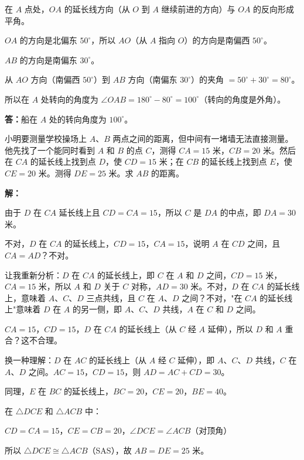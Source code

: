 \documentclass[12pt, a4paper]{ctexart}
\begin{document}
在 $A$ 点处，$OA$ 的延长线方向（从 $O$ 到 $A$ 继续前进的方向）与 $OA$ 的反向形成平角。

$OA$ 的方向是北偏东 $50^\circ$，所以 $AO$（从 $A$ 指向 $O$）的方向是南偏西 $50^\circ$。

$AB$ 的方向是南偏东 $30^\circ$。

从 $AO$ 方向（南偏西 $50^\circ$）到 $AB$ 方向（南偏东 $30^\circ$）的夹角 $=50^\circ+30^\circ=80^\circ$。

所以在 $A$ 处转向的角度为 $\angle OAB=180^\circ-80^\circ=100^\circ$（转向的角度是外角）。

\textbf{答：}船在 $A$ 处的转向角度为 $100^\circ$。

\vspace{6pt}

\begin{appbox}[【应用3】测量中的几何应用]
小明要测量学校操场上 $A$、$B$ 两点之间的距离，但中间有一堵墙无法直接测量。他先找了一个能同时看到 $A$ 和 $B$ 的点 $C$，测得 $CA=15$ 米，$CB=20$ 米。然后在 $CA$ 的延长线上找到点 $D$，使 $CD=15$ 米；在 $CB$ 的延长线上找到点 $E$，使 $CE=20$ 米。测得 $DE=25$ 米。求 $AB$ 的距离。
\end{appbox}

\textbf{解：}

由于 $D$ 在 $CA$ 延长线上且 $CD=CA=15$，所以 $C$ 是 $DA$ 的中点，即 $DA=30$ 米。

不对，$D$ 在 $CA$ 的延长线上，$CD=15$，$CA=15$，说明 $A$ 在 $CD$ 之间，且 $CA=AD$？不对。

让我重新分析：$D$ 在 $CA$ 的延长线上，即 $C$ 在 $A$ 和 $D$ 之间，$CD=15$ 米，$CA=15$ 米，所以 $A$ 和 $D$ 关于 $C$ 对称，$AD=30$ 米。不对，$D$ 在 $CA$ 的延长线上，意味着 $A$、$C$、$D$ 三点共线，且 $C$ 在 $A$、$D$ 之间？不对，"在 $CA$ 的延长线上"意味着 $D$ 在 $A$ 的另一侧，即 $A$、$C$、$D$ 共线，$A$ 在 $C$ 和 $D$ 之间。

$CA=15$，$CD=15$，$D$ 在 $CA$ 的延长线上（从 $C$ 经 $A$ 延伸），所以 $D$ 和 $A$ 重合？这不合理。

换一种理解：$D$ 在 $AC$ 的延长线上（从 $A$ 经 $C$ 延伸），即 $A$、$C$、$D$ 共线，$C$ 在 $A$、$D$ 之间。$AC=15$，$CD=15$，则 $AD=AC+CD=30$。

同理，$E$ 在 $BC$ 的延长线上，$BC=20$，$CE=20$，$BE=40$。

在 $\triangle DCE$ 和 $\triangle ACB$ 中：

$CD=CA=15$，$CE=CB=20$，$\angle DCE=\angle ACB$（对顶角）

所以 $\triangle DCE\cong\triangle ACB$（SAS），故 $AB=DE=25$ 米。
\end{document}
